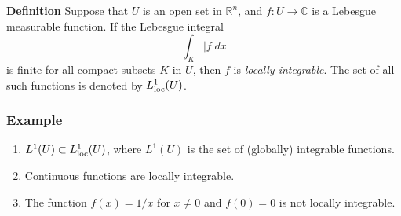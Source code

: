 \documentclass[12pt]{article}
\newcommand{\sR}[0]{\mathbb{R}}
\newcommand{\sC}[0]{\mathbb{C}}
\begin{document}
{\bf Definition} 
Suppose that $U$ is an open set in $\sR^n$, and 
$f\colon U\to\sC$ is a Lebesgue measurable function. 
If the Lebesgue integral
$$
   \int_K |f| dx
$$
is finite for all compact subsets $K$ in $U$, then $f$ is
\emph{locally integrable}. The set of all
such functions is denoted by 
$L^1_{\scriptsize{\mbox{loc}}}(U)$.

\subsubsection*{Example}
\begin{enumerate}
\item $L^1(U)\subset L^1_{\scriptsize{\mbox{loc}}}(U)$, where
$L^1(U)$ is the set of (globally) integrable functions. 
\item Continuous functions are locally integrable.
\item The function $f(x)=1/x$ for $x\neq 0$ and $f(0)=0$ 
is not locally integrable. 
\end{enumerate}
\end{document}
